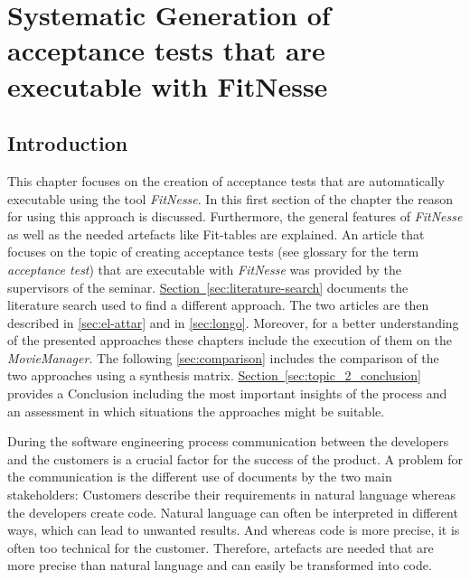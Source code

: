 

\chapter{Systematic Generation of acceptance tests that are executable with FitNesse}
\label{sec:topic_2}

\section{Introduction}\label{sec:topic_2_intro}

This chapter focuses on the creation of acceptance tests that are automatically executable using the tool \textit{FitNesse}.
In this first section of the chapter the reason for using this approach is discussed.
Furthermore, the general features of \textit{FitNesse} as well as the needed artefacts like Fit-tables are explained.
An article that focuses on the topic of creating acceptance tests (see glossary for the term \textit{acceptance test}) that are executable with \textit{FitNesse} was provided by the supervisors of the seminar.
\hyperref[Section]{Section~\ref{sec:literature-search}} documents the literature search used to find a different approach.
The two articles are then described in \autoref{sec:el-attar} and in \autoref{sec:longo}.
Moreover, for a better understanding of the presented approaches these chapters include the execution of them on the \textit{MovieManager}.
The following \autoref{sec:comparison} includes the comparison of the two approaches using a synthesis matrix.
\hyperref[Section]{Section~\ref{sec:topic_2_conclusion}} provides a Conclusion including the most important insights of the process and an assessment in which situations the approaches might be suitable.

During the software engineering process communication between the developers and the customers is a crucial factor for the success of the product.
A problem for the communication is the different use of documents by the two main stakeholders:
Customers describe their requirements in natural language whereas the developers create code.
Natural language can often be interpreted in different ways, which can lead to unwanted results.
And whereas code is more precise, it is often too technical for the customer.
Therefore, artefacts are needed that are more precise than natural language and can easily be transformed into code.

